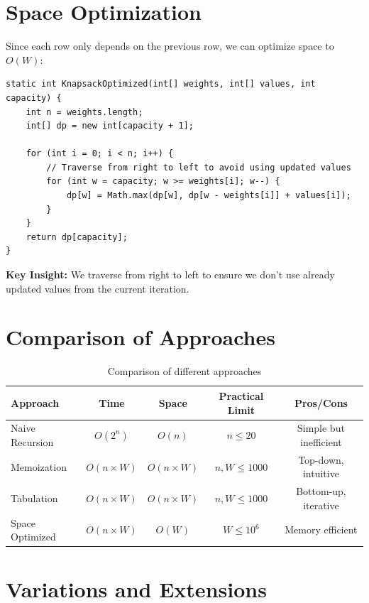 \documentclass[12pt,a4paper]{article}
\begin{document}
\section{Space Optimization}

Since each row only depends on the previous row, we can optimize space to $O(W)$:

\begin{lstlisting}[caption=Space-Optimized Tabulation]
static int KnapsackOptimized(int[] weights, int[] values, int capacity) {
    int n = weights.length;
    int[] dp = new int[capacity + 1];
    
    for (int i = 0; i < n; i++) {
        // Traverse from right to left to avoid using updated values
        for (int w = capacity; w >= weights[i]; w--) {
            dp[w] = Math.max(dp[w], dp[w - weights[i]] + values[i]);
        }
    }
    return dp[capacity];
}
\end{lstlisting}

\textbf{Key Insight:} We traverse from right to left to ensure we don't use already updated values from the current iteration.

\section{Comparison of Approaches}

\begin{table}[h]
\centering
\begin{tabular}{|l|c|c|c|c|}
\hline
\textbf{Approach} & \textbf{Time} & \textbf{Space} & \textbf{Practical Limit} & \textbf{Pros/Cons} \\
\hline
Naive Recursion & $O(2^n)$ & $O(n)$ & $n \leq 20$ & Simple but inefficient \\
\hline
Memoization & $O(n \times W)$ & $O(n \times W)$ & $n, W \leq 1000$ & Top-down, intuitive \\
\hline
Tabulation & $O(n \times W)$ & $O(n \times W)$ & $n, W \leq 1000$ & Bottom-up, iterative \\
\hline
Space Optimized & $O(n \times W)$ & $O(W)$ & $W \leq 10^6$ & Memory efficient \\
\hline
\end{tabular}
\caption{Comparison of different approaches}
\end{table}

\section{Variations and Extensions}
\end{document}
